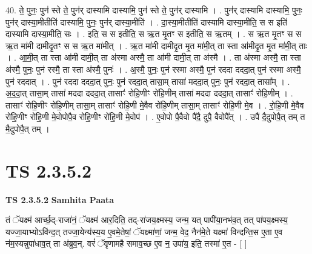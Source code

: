 \documentclass[17pt]{extarticle}
\begin{document}
40. ते॒ पुनः॒ पुन॑ स्ते ते॒ पुन॑र् दास्यामि दास्यामि॒ पुन॑ स्ते ते॒ पुन॑र् दास्यामि । . पुन॑र् दास्यामि दास्यामि॒ पुनः॒ पुन॑र् दास्या॒मीतीति॑ दास्यामि॒ पुनः॒ पुन॑र् दास्या॒मीति॑ । . दा॒स्या॒मीतीति॑ दास्यामि दास्या॒मीति॒ स स इति॑ दास्यामि दास्या॒मीति॒ सः । . इति॒ स स इतीति॒ स ऋ॒त मृ॒तꣳ स इतीति॒ स ऋ॒तम् । . स ऋ॒त मृ॒तꣳ स स ऋ॒त मा॑मी दामीदृ॒तꣳ स स ऋ॒त मा॑मीत् । . ऋ॒त मा॑मी दामीदृ॒त मृ॒त मा॑मी॒त् ता स्ता आ॑मीदृ॒त मृ॒त मा॑मी॒त् ताः । . आ॒मी॒त् ता स्ता आ॑मी दामी॒त् ता अ॑स्मा अस्मै॒ ता आ॑मी दामी॒त् ता अ॑स्मै । . ता अ॑स्मा अस्मै॒ ता स्ता अ॑स्मै॒ पुनः॒ पुन॑ रस्मै॒ ता स्ता अ॑स्मै॒ पुनः॑ । . अ॒स्मै॒ पुनः॒ पुन॑ रस्मा अस्मै॒ पुन॑ रददा दददा॒त् पुन॑ रस्मा अस्मै॒ पुन॑ रददात् । . पुन॑ रददा दददा॒त् पुनः॒ पुन॑ रददा॒त् तासा॒म् तासा॑ मददा॒त् पुनः॒ पुन॑ रददा॒त् तासा᳚म् । . अ॒द॒दा॒त् तासा॒म् तासा॑ मददा दददा॒त् तासाꣳ॑ रोहि॒णीꣳ रो॑हि॒णीम् तासा॑ मददा दददा॒त् तासाꣳ॑ रोहि॒णीम् । . तासाꣳ॑ रोहि॒णीꣳ रो॑हि॒णीम् तासा॒म् तासाꣳ॑ रोहि॒णी मे॒वैव रो॑हि॒णीम् तासा॒म् तासाꣳ॑ रोहि॒णी मे॒व । . रो॒हि॒णी मे॒वैव रो॑हि॒णीꣳ रो॑हि॒णी मे॒वोपोपै॒व रो॑हि॒णीꣳ रो॑हि॒णी मे॒वोप॑ । . ए॒वोपो पै॒वैवो पै॑दै॒ दुपै॒ वैवोपै᳚त् । . उपै॑ दै॒दुपोपै॒त् तम् त मै॒दुपोपै॒त् तम् । \newline
\pagebreak
{}

\section{ TS 2.3.5.2 }

\textbf{TS 2.3.5.2 } \newline
\textbf{Samhita Paata} \newline

तं ॅयक्ष्म॑ आर्च्छ॒द्-राजा॑नं॒ ॅयक्ष्म॑ आर॒दिति॒ तद्-रा॑जय॒क्ष्मस्य॒ जन्म॒ यत् पापी॑या॒नभ॑व॒त् तत् पा॑पय॒क्ष्मस्य॒ यज्जा॒याभ्योऽवि॑न्द॒त् तज्जा॒येन्य॑स्य॒य ए॒वमे॒तेषां॒ ॅयक्ष्मा॑णां॒ जन्म॒ वेद॒ नैन॑मे॒ते यक्ष्मा॑ विन्दन्ति॒स ए॒ता ए॒व न॑म॒स्यन्नुपा॑धाव॒त् ता अ॑ब्रुव॒न्. वरं॑ ॅवृणामहै समाव॒च्छ ए॒व न॒ उपा॑य॒ इति॒ तस्मा॑ ए॒त - [  ] \newline
\end{document}

